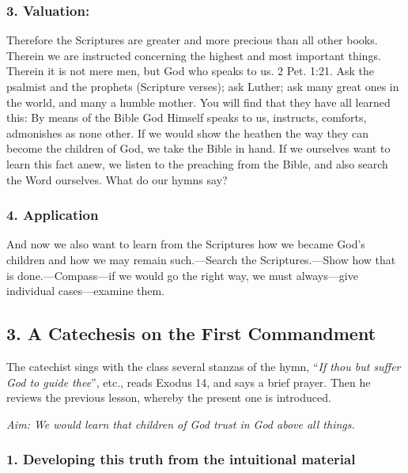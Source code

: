 \subsubsection{3. Valuation:} Therefore the Scriptures are greater and more precious than all other books. Therein we are instructed concerning the highest and most important things. Therein it is not mere men, but God who speaks to us. 2 Pet. 1:21. Ask the psalmist and the prophets (Scripture verses); ask Luther; ask many great ones in the world, and many a humble mother. You will find that they have all learned this: By means of the Bible God Himself speaks to us, instructs, comforts, admonishes as none other. If we would show the heathen the way they can become the children of God, we take the Bible in hand. If we ourselves want to learn this fact anew, we listen to the preaching from the Bible, and also search the Word ourselves. What do our hymns say?

\subsubsection{4. Application} And now we also want to learn from the Scriptures how we became God’s children and how we may remain such.—Search the Scriptures.—Show how that is done.—Compass—if we would go the right way, we must always—give individual cases—examine them.

\subsection{3. A Catechesis on the First Commandment}

The catechist sings with the class several stanzas of the hymn, “\emph{If thou but suffer God to guide thee}”, etc., reads Exodus 14, and says a brief prayer. Then he reviews the previous lesson, whereby the present one is introduced.

\emph{Aim: We would learn that children of God trust in God above all things.}

\subsubsection{1. Developing this truth from the intuitional material}

